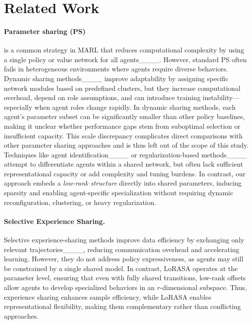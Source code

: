 \section{Related Work}
\label{sec:related_work}

\paragraph{Parameter sharing (PS)} is a common strategy in MARL that reduces computational complexity by using a single policy or value network for all agents____. However, standard PS often fails in heterogeneous environments where agents require diverse behaviors. Dynamic sharing methods____ improve adaptability by assigning specific network modules based on predefined clusters, but they increase computational overhead, depend on role assumptions, and can introduce training instability—especially when agent roles change rapidly. In dynamic sharing methods, each agent's parameter subset can be significantly smaller than other policy baselines, making it unclear whether performance gaps stem from suboptimal selection or insufficient capacity. This scale discrepancy complicates direct comparisons with other parameter sharing approaches and is thus left out of the scope of this study. Techniques like agent identification____ or regularization-based methods____ attempt to differentiate agents within a shared network, but often lack sufficient representational capacity or add complexity and tuning burdens. In contrast, our approach embeds a \emph{low-rank structure} directly into shared parameters, inducing sparsity and enabling agent-specific specialization without requiring dynamic reconfiguration, clustering, or heavy regularization.


\paragraph{Selective Experience Sharing.}
Selective experience-sharing methods improve data efficiency by exchanging only relevant trajectories____, reducing communication overhead and accelerating learning. However, they do not address policy expressiveness, as agents may still be constrained by a single shared model. In contrast, LoRASA operates at the parameter level, ensuring that even with fully shared transitions, low-rank offsets allow agents to develop specialized behaviors in an \(r\)-dimensional subspace. Thus, experience sharing enhances sample efficiency, while LoRASA enables representational flexibility, making them complementary rather than conflicting approaches.

